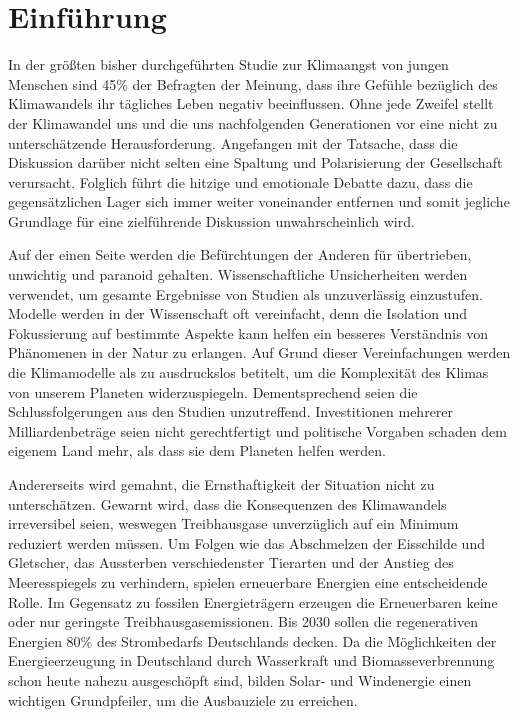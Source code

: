 \documentclass[12pt, a4paper]{article}
\begin{document}
\tableofcontents


\newpage
\setcounter{section}{0}


\section{Einführung}


In der größten bisher durchgeführten Studie zur Klimaangst von jungen Menschen sind 45\% der Befragten der Meinung, dass ihre Gefühle bezüglich des Klimawandels ihr tägliches Leben negativ beeinflussen. Ohne jede Zweifel stellt der Klimawandel uns und die uns nachfolgenden Generationen vor eine nicht zu unterschätzende Herausforderung. Angefangen mit der Tatsache, dass die Diskussion darüber nicht selten eine Spaltung und Polarisierung der Gesellschaft verursacht. Folglich führt die hitzige und emotionale Debatte dazu, dass die gegensätzlichen Lager sich immer weiter voneinander entfernen und somit jegliche Grundlage für eine zielführende Diskussion unwahrscheinlich wird.

Auf der einen Seite werden die Befürchtungen der Anderen für übertrieben, unwichtig und paranoid gehalten. Wissenschaftliche Unsicherheiten werden verwendet, um gesamte Ergebnisse von Studien als unzuverlässig einzustufen. Modelle werden in der Wissenschaft oft vereinfacht, denn die Isolation und Fokussierung auf bestimmte Aspekte kann helfen ein besseres Verständnis von Phänomenen in der Natur zu erlangen. Auf Grund dieser Vereinfachungen werden die Klimamodelle als zu ausdruckslos betitelt, um die Komplexität des Klimas von unserem Planeten widerzuspiegeln. Dementsprechend seien die Schlussfolgerungen aus den Studien unzutreffend. Investitionen mehrerer Milliardenbeträge seien nicht gerechtfertigt und politische Vorgaben schaden dem eigenem Land mehr, als dass sie dem Planeten helfen werden.

Andererseits wird gemahnt, die Ernsthaftigkeit der Situation nicht zu unterschätzen. Gewarnt wird, dass die Konsequenzen des Klimawandels irreversibel seien, weswegen Treibhausgase unverzüglich auf ein Minimum reduziert werden müssen. Um Folgen wie das Abschmelzen der Eisschilde und Gletscher, das Aussterben verschiedenster Tierarten und der Anstieg des Meeresspiegels zu verhindern, spielen erneuerbare Energien eine entscheidende Rolle. Im Gegensatz zu fossilen Energieträgern erzeugen die Erneuerbaren keine oder nur geringste Treibhausgasemissionen. Bis 2030 sollen die regenerativen Energien 80\% des Strombedarfs Deutschlands decken. Da die Möglichkeiten der Energieerzeugung in Deutschland durch Wasserkraft und Biomasseverbrennung schon heute nahezu ausgeschöpft sind, bilden Solar- und Windenergie einen wichtigen Grundpfeiler, um die Ausbauziele zu erreichen. 
\end{document}
